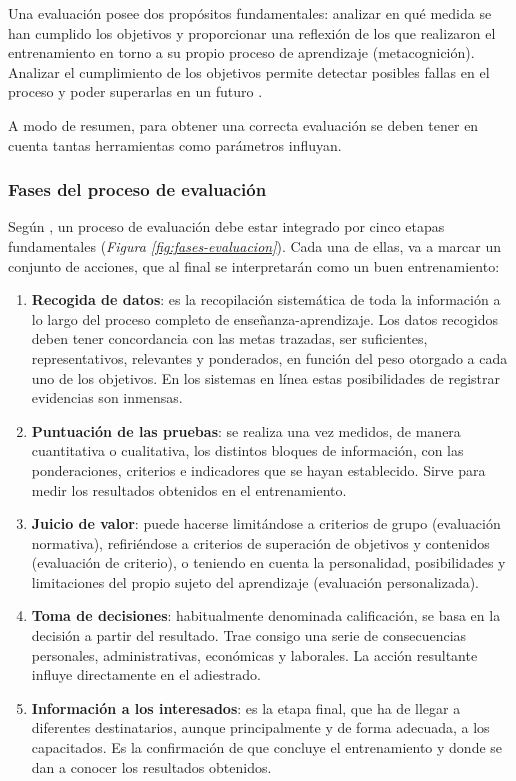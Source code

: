 Una evaluación posee dos propósitos fundamentales: analizar en qué medida se han cumplido los objetivos y proporcionar una reflexión de los que realizaron el entrenamiento en torno a su propio proceso de aprendizaje (metacognición). Analizar el cumplimiento de los objetivos permite detectar posibles fallas en el proceso y poder superarlas en un futuro \cite{Aretio2020}.

A modo de resumen, para obtener una correcta evaluación se deben tener en cuenta tantas herramientas como parámetros influyan.

\subsubsection{Fases del proceso de evaluación}
Según \cite{Aretio2020}, un proceso de evaluación debe estar integrado por cinco etapas fundamentales (\textsl{Figura \ref{fig:fases-evaluacion}}). Cada una de ellas, va a marcar un conjunto de acciones, que al final se interpretarán como un buen entrenamiento:

\begin{enumerate}
\item \textbf{Recogida de datos}: es la recopilación sistemática de toda la información a lo largo del proceso completo de enseñanza-aprendizaje. Los datos recogidos deben tener concordancia con las metas trazadas, ser suficientes, representativos, relevantes y ponderados, en función del peso otorgado a cada uno de los objetivos. En los sistemas en línea estas posibilidades de registrar evidencias son inmensas.
\item \textbf{Puntuación de las pruebas}: se realiza una vez medidos, de manera cuantitativa o cualitativa, los distintos bloques de información, con las ponderaciones, criterios e indicadores que se hayan establecido. Sirve para medir los resultados obtenidos en el entrenamiento.
\item \textbf{Juicio de valor}: puede hacerse limitándose a criterios de grupo (evaluación normativa), refiriéndose a criterios de superación de objetivos y contenidos (evaluación de criterio), o teniendo en cuenta la personalidad, posibilidades y limitaciones del propio sujeto del aprendizaje (evaluación personalizada).
\item \textbf{Toma de decisiones}: habitualmente denominada calificación, se basa en la decisión a partir del resultado. Trae consigo una serie de consecuencias personales, administrativas, económicas y laborales. La acción resultante influye directamente en el adiestrado.
\item \textbf{Información a los interesados}: es la etapa final, que ha de llegar a diferentes destinatarios, aunque principalmente y de forma adecuada, a los capacitados. Es la confirmación de que concluye el entrenamiento y donde se dan a conocer los resultados obtenidos.
\end{enumerate}

